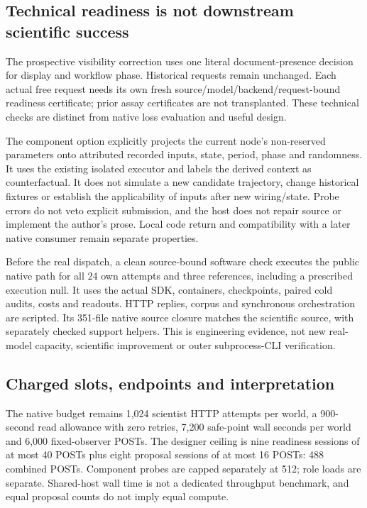 \subsection{Technical readiness is not downstream scientific success}
The prospective visibility correction uses one literal document-presence
decision for display and workflow phase. Historical requests remain unchanged.
Each actual free request needs its own fresh source/model/backend/request-bound
readiness certificate; prior assay certificates are not transplanted. These
technical checks are distinct from native loss evaluation and useful design.

The component option explicitly projects the current node's non-reserved
parameters onto attributed recorded inputs, state, period, phase and randomness.
It uses the existing isolated executor and labels the derived context as
counterfactual. It does not simulate a new candidate trajectory, change historical
fixtures or establish the applicability of inputs after new wiring/state.
Probe errors do not veto explicit submission, and the host does not repair
source or implement the author's prose. Local code return and compatibility
with a later native consumer remain separate properties.

Before the real dispatch, a clean source-bound software check executes the
public native path for all 24 own attempts and three references, including a
prescribed execution null. It uses the actual SDK, containers, checkpoints,
paired cold audits, costs and readouts. HTTP replies, corpus and synchronous
orchestration are scripted. Its
351-file native source closure matches the scientific source, with separately
checked support helpers. This is engineering evidence, not new real-model
capacity, scientific improvement or outer subprocess-CLI verification.

\subsection{Charged slots, endpoints and interpretation}
The native budget remains 1,024 scientist HTTP attempts per world, a 900-second
read allowance with zero retries, 7,200 safe-point wall seconds per world and
6,000 fixed-observer POSTs. The designer ceiling is nine readiness sessions of
at most 40 POSTs plus eight proposal sessions of at most 16 POSTs: 488 combined
POSTs. Component probes are capped separately at 512; role loads are separate.
Shared-host wall time is not a dedicated throughput benchmark, and equal
proposal counts do not imply equal compute.

